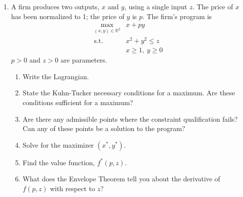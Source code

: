 \documentclass[11pt,letterpaper]{scrartcl}
\begin{document}
\begin{enumerate}
	\item A firm produces two outputs, $x$ and $y$, using a single input $z$.
	The price of $x$ has been normalized to 1; the price of $y$ is $p$.
	The firm's program is
	\begin{align*}
	\max_{\left(x,y\right)\in\mathbb{R}^{2}} & x+py\\
	\text{s.t. } & x^{2}+y^{2}\leq z\\
	 & x\geq1,\ y\geq0
	\end{align*}
	$p>0$ and $z>0$ are parameters.
	\begin{enumerate}
	\item Write the Lagrangian.
	\item State the Kuhn-Tucker necessary conditions for a maximum. Are these
	conditions sufficient for a maximum?
	\item Are there any admissible points where the constraint qualification
	fails? Can any of these points be a solution to the program?
	\item Solve for the maximizer $\left(x^{*},y^{*}\right)$.
	\item Find the value function, $f^{*}\left(p,z\right)$.
	\item What does the Envelope Theorem tell you about the derivative of $f\left(p,z\right)$
	with respect to $z$?
	\end{enumerate}
	
\end{enumerate}
\end{document}
